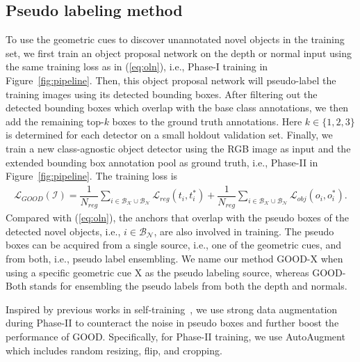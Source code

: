 \documentclass{article} \usepackage{iclr2023_conference,times}
\begin{document}
\subsection{Pseudo labeling method}\label{sec:pipeline}
To use the geometric cues to discover unannotated novel objects in the training set, we first train an object proposal network on the depth or normal input using the same training loss as in (\ref{eq:oln}), i.e., Phase-I training in Figure~\ref{fig:pipeline}. 
Then, this object proposal network will pseudo-label the training images using its detected bounding boxes. 
After filtering out the detected bounding boxes which overlap with the base class annotations, we then add the remaining top-$k$ boxes to the ground truth annotations. 
Here $k \in \{1,2,3\}$ is determined for each detector on a small holdout validation set. Finally, we train a new class-agnostic object detector using the RGB image as input and the extended bounding box annotation pool as ground truth, i.e., Phase-II in Figure~\ref{fig:pipeline}. The training loss is
\begin{align}\label{eq:good}
    \mathcal{L}_{GOOD}(\mathcal{I})=\dfrac{1}{N_{reg}} \sum_{i\in \mathcal{B}_{\mathcal{K}}\cup \mathcal{B}_{\mathcal{N}}}  \mathcal{L}_{reg}(t_i, t_i^*) +     \dfrac{1}{N_{reg}} \sum_{i\in \mathcal{B}_{\mathcal{K}}\cup \mathcal{B}_{\mathcal{N}}} \mathcal{L}_{obj}(o_i, o_i^*).
\end{align}
Compared with (\ref{eq:oln}), the anchors that overlap with the pseudo boxes of the detected novel objects, i.e., $i\in\mathcal{B}_{\mathcal{N}}$, are also involved in training. 
The pseudo boxes can be acquired from a single source, i.e., one of the geometric cues, and from both, i.e., pseudo label ensembling. We name our method $\mathrm{GOOD}$-$\mathrm{X}$ when using a specific geometric cue $\mathrm{X}$ as the pseudo labeling source, whereas $\mathrm{GOOD}$-$\mathrm{Both}$ stands for ensembling the pseudo labels from both the depth and normals. 


Inspired by previous works in self-training~\citep{xie2020self, sohn2020fixmatch, xu2021softteacher}, we use strong data augmentation during Phase-II to counteract the noise in pseudo boxes and further boost the performance of GOOD.  
Specifically, for Phase-II training, we use AutoAugment~\citep{cubuk2019autoaugment} which includes random resizing, flip, and cropping. 



 
\end{document}

